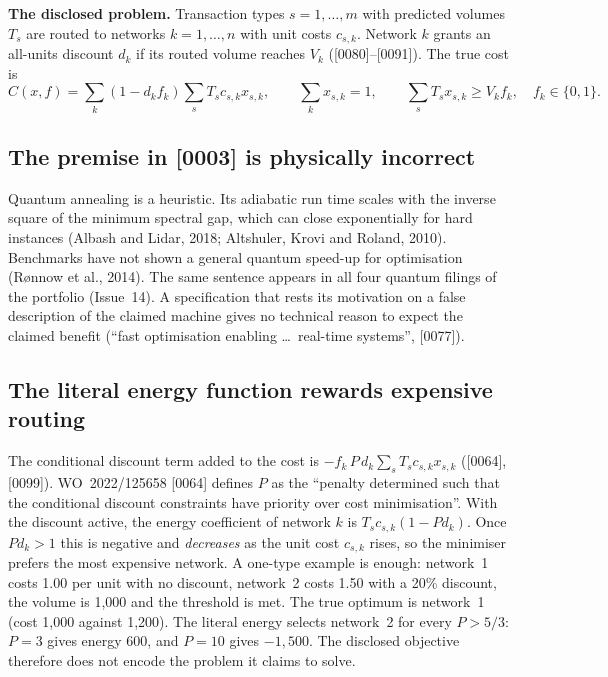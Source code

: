 \documentclass[10pt,a4paper]{article}
\begin{document}
\noindent\textbf{The disclosed problem.} Transaction types $s=1,\dots,m$ with predicted volumes $T_s$ are routed to networks $k=1,\dots,n$ with unit costs $c_{s,k}$. Network $k$ grants an all-units discount $d_k$ if its routed volume reaches $V_k$ ([0080]--[0091]). The true cost is
\[ \textstyle C(x,f)=\sum_k (1-d_k f_k)\sum_s T_s c_{s,k} x_{s,k},\qquad \sum_k x_{s,k}=1,\qquad \sum_s T_s x_{s,k}\ge V_k f_k,\quad f_k\in\{0,1\}. \]

\subsection{The premise in [0003] is physically incorrect}
Quantum annealing is a heuristic. Its adiabatic run time scales with the inverse square of the minimum spectral gap, which can close exponentially for hard instances (Albash and Lidar, 2018; Altshuler, Krovi and Roland, 2010). Benchmarks have not shown a general quantum speed-up for optimisation (R{\o}nnow et al., 2014). The same sentence appears in all four quantum filings of the portfolio (Issue~14). A specification that rests its motivation on a false description of the claimed machine gives no technical reason to expect the claimed benefit (``fast optimisation enabling \ldots\ real-time systems'', [0077]).

\subsection{The literal energy function rewards expensive routing}
The conditional discount term added to the cost is $-f_k\,P\,d_k\sum_s T_s c_{s,k}x_{s,k}$ ([0064], [0099]). WO~2022/125658 [0064] defines $P$ as the ``penalty determined such that the conditional discount constraints have priority over cost minimisation''. With the discount active, the energy coefficient of network $k$ is $T_s c_{s,k}(1-Pd_k)$. Once $Pd_k>1$ this is negative and \emph{decreases} as the unit cost $c_{s,k}$ rises, so the minimiser prefers the most expensive network. A one-type example is enough: network~1 costs 1.00 per unit with no discount, network~2 costs 1.50 with a 20\% discount, the volume is 1,000 and the threshold is met. The true optimum is network~1 (cost 1,000 against 1,200). The literal energy selects network~2 for every $P>5/3$: $P=3$ gives energy 600, and $P=10$ gives $-1{,}500$. The disclosed objective therefore does not encode the problem it claims to solve.
\end{document}
